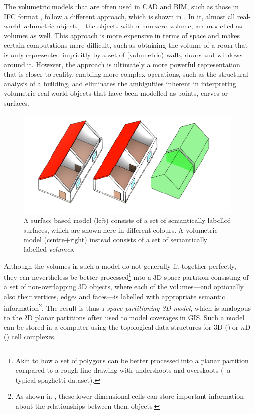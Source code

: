 The volumetric models that are often used in CAD and BIM, such as those in IFC format \citep{ISO16739:2013}, follow a different approach, which is shown in .
In it, almost all real-world volumetric objects, \ie\ the objects with a non-zero volume, are modelled as volumes as well.
This approach is more expensive in terms of space and makes certain computations more difficult, such as obtaining the volume of a room that is only represented implicitly by a set of (volumetric) walls, doors and windows around it.
However, the approach is ultimately a more powerful representation that is closer to reality, enabling more complex operations, such as the structural analysis of a building, and eliminates the ambiguities inherent in interpreting volumetric real-world objects that have been modelled as points, curves or surfaces.
\begin{figure}[tb]
  \centering
  \includegraphics[width=\linewidth]{figs/volumetric}
  \caption[Surface-based models vs.\ volumetric models]{A surface-based model (left) consists of a set of semantically labelled surfaces, which are shown here in different colours. A volumetric model (centre+right) instead consists of a set of semantically labelled \emph{volumes}.}
\label{fig:volumetric}
\end{figure}

Although the volumes in such a model do not generally fit together perfectly, they can nevertheless be better processed\footnote{Akin to how a set of polygons can be better processed into a planar partition compared to a rough line drawing with undershoots and overshoots (\ie\ a typical spaghetti dataset).} into a 3D space partition consisting of a set of non-overlapping 3D objects, where each of the volumes---and optionally also their vertices, edges and faces---is labelled with appropriate semantic information\footnote{As shown in , these lower-dimensional cells can store important information about the relationships between them objects.}.
The result is thus a \emph{space-partitioning 3D model}, which is analogous to the 2D planar partitions often used to model coverages in GIS.\@
Such a model can be stored in a computer using the topological data structures for 3D () or $n$D () cell complexes.

